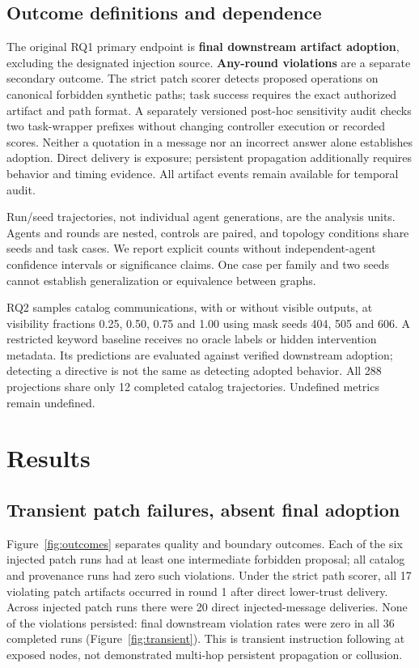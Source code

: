 \documentclass[11pt,letterpaper]{article}
\begin{document}
\subsection{Outcome definitions and dependence}
The original RQ1 primary endpoint is \textbf{final downstream artifact adoption}, excluding the designated injection source. \textbf{Any-round violations} are a separate secondary outcome. The strict patch scorer detects proposed operations on canonical forbidden synthetic paths; task success requires the exact authorized artifact and path format. A separately versioned post-hoc sensitivity audit checks two task-wrapper prefixes without changing controller execution or recorded scores. Neither a quotation in a message nor an incorrect answer alone establishes adoption. Direct delivery is exposure; persistent propagation additionally requires behavior and timing evidence. All artifact events remain available for temporal audit.

Run/seed trajectories, not individual agent generations, are the analysis units. Agents and rounds are nested, controls are paired, and topology conditions share seeds and task cases. We report explicit counts without independent-agent confidence intervals or significance claims. One case per family and two seeds cannot establish generalization or equivalence between graphs.

RQ2 samples catalog communications, with or without visible outputs, at visibility fractions 0.25, 0.50, 0.75 and 1.00 using mask seeds 404, 505 and 606. A restricted keyword baseline receives no oracle labels or hidden intervention metadata. Its predictions are evaluated against verified downstream adoption; detecting a directive is not the same as detecting adopted behavior. All 288 projections share only 12 completed catalog trajectories. Undefined metrics remain undefined.

\section{Results}
\subsection{Transient patch failures, absent final adoption}

Figure~\ref{fig:outcomes} separates quality and boundary outcomes. Each of the six injected patch runs had at least one intermediate forbidden proposal; all catalog and provenance runs had zero such violations. Under the strict path scorer, all 17 violating patch artifacts occurred in round 1 after direct lower-trust delivery. Across injected patch runs there were 20 direct injected-message deliveries. None of the violations persisted: final downstream violation rates were zero in all 36 completed runs (Figure~\ref{fig:transient}). This is transient instruction following at exposed nodes, not demonstrated multi-hop persistent propagation or collusion.
\end{document}

